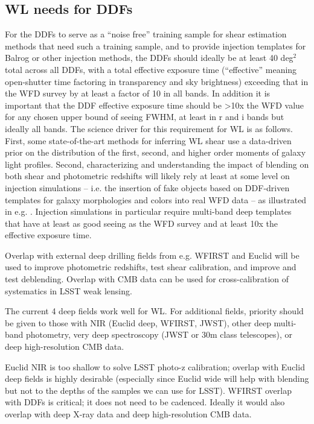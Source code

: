 \subsection{WL needs for DDFs}

For the DDFs to serve as a ``noise free'' training sample for shear estimation methods that need
such a training sample, and to provide injection templates for Balrog or other injection methods,
the DDFs should ideally be at least 40 deg$^2$ total across all DDFs, with a total effective
exposure time (``effective'' meaning open-shutter time factoring in transparency and sky brightness) 
exceeding that in the WFD survey by at least a factor of 10 in all bands.  In addition it is
important that the DDF effective exposure time should be >10x the WFD value for any chosen upper bound
of seeing FWHM, at least in r and i bands but ideally all bands.  The science driver for this
requirement for WL is as follows.  First, some state-of-the-art methods for inferring WL shear
\citep{2014MNRAS.438.1880B,2014MNRAS.438.1880B} use a data-driven prior on the distribution of
the first, second, and higher order moments of galaxy light profiles.  Second, characterizing and
understanding the impact of blending on both shear and photometric redshifts will likely rely at
least at some level on injection simulations -- i.e. the insertion of fake objects based on
DDF-driven templates for galaxy morphologies and colors into real WFD data -- as illustrated in
e.g. \citet{2016MNRAS.457..786S,2018PASJ...70S...6H}.  Injection simulations in particular require
multi-band deep templates that have at least as good seeing as the WFD survey and at least 10x the
effective exposure time.

Overlap with external deep drilling fields from e.g. WFIRST and Euclid will be used to improve
photometric redshifts, test shear calibration, and improve and test deblending. Overlap with CMB
data can be used for cross-calibration of systematics in LSST weak lensing. 

The current 4 deep fields work well for WL.  For additional fields, priority should be given to
those with NIR (Euclid deep, WFIRST, JWST), other deep multi-band photometry, very deep
spectroscopy (JWST or 30m class telescopes), or deep high-resolution CMB data.

Euclid NIR is too shallow to solve LSST photo-z calibration; overlap with Euclid deep fields is
highly desirable (especially since Euclid wide will help with blending but not to the depths of the
samples we can use for LSST). WFIRST overlap with DDFs is critical; it does not need to be cadenced.  Ideally it would also overlap with
deep X-ray data and deep high-resolution CMB data.

